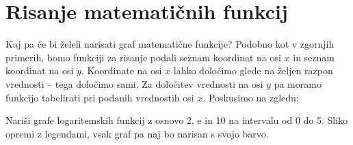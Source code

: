 \section{Risanje matematičnih funkcij}

Kaj pa če bi želeli narisati graf matematične funkcije? Podobno kot v zgornjih primerih, bomo funkciji za risanje podali seznam koordinat na osi $x$ in seznam koordinat na osi $y$. Koordinate na osi $x$ lahko določimo glede na željen razpon vrednosti -- tega določimo sami. Za določitev vrednosti na osi $y$ pa moramo funkcijo tabelirati pri podanih vrednostih osi $x$. Poskusimo na zgledu:

\begin{zgled}
Nariši grafe logaritemskih funkcij z osnovo 2, $\textrm{e}$ in 10 na intervalu od 0 do 5. Sliko opremi z legendami, vsak graf pa naj bo narisan s svojo barvo.
\end{zgled}

